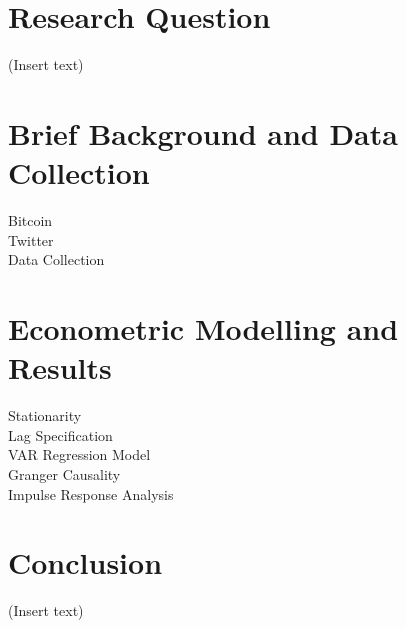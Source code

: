 \documentclass[a4paper,american,12pt]{article}
\begin{document}
\clearpage

	\begin{spacing}{1.2}
	\cleardoublepage{}
		
		\section{Research Question}
			\begin{spacing}{1.5}
			(Insert text)
			\end{spacing}
		\clearpage
		
		\section{Brief Background and Data Collection}
			\begin{spacing}{1.5}
			Bitcoin\\
			Twitter\\
			Data Collection\\
			\end{spacing}		
		\clearpage
		
		\section{Econometric Modelling and Results}
			\begin{spacing}{1.5}
			Stationarity\\
			Lag Specification\\
			VAR Regression Model\\
			Granger Causality\\
			Impulse Response Analysis\\
			\end{spacing}		
		\clearpage
		
		\section{Conclusion}
			\begin{spacing}{1.5}
			(Insert text)
			\end{spacing}
		\clearpage
		
	\end{spacing}

\clearpage

\printbibliography
\clearpage

\end{document}
